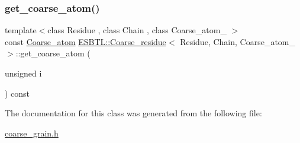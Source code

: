 \mbox{\label{classESBTL_1_1Coarse__residue_a2dd7b7ebb517675fdb74b006f36d61fc}} 
\subsubsection{\texorpdfstring{get\+\_\+coarse\+\_\+atom()}{get\_coarse\_atom()}}
{\footnotesize\ttfamily template$<$class Residue , class Chain , class Coarse\+\_\+atom\+\_\+ $>$ \\
const \hyperlink{classESBTL_1_1Coarse__residue_a4e83dc008345f6b828bcd3a67045a051}{Coarse\+\_\+atom} \hyperlink{classESBTL_1_1Coarse__residue}{E\+S\+B\+T\+L\+::\+Coarse\+\_\+residue}$<$ Residue, Chain, Coarse\+\_\+atom\+\_\+ $>$\+::get\+\_\+coarse\+\_\+atom (\begin{DoxyParamCaption}\item[{unsigned}]{i }\end{DoxyParamCaption}) const\hspace{0.3cm}{\ttfamily [inline]}}



The documentation for this class was generated from the following file\+:\begin{DoxyCompactItemize}
\item 
\hyperlink{coarse__grain_8h}{coarse\+\_\+grain.\+h}\end{DoxyCompactItemize}

